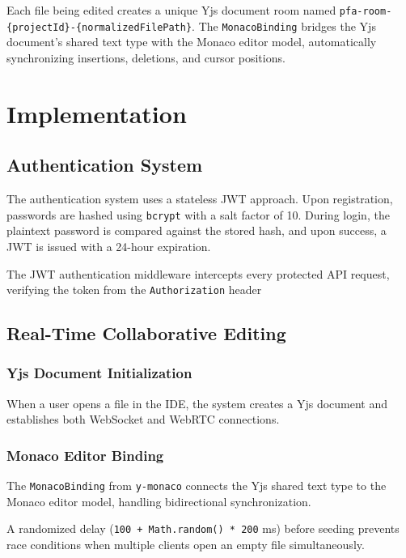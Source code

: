 \documentclass[12pt,a4paper,oneside]{report}
\begin{document}
Each file being edited creates a unique Yjs document room named \texttt{pfa-room-\{projectId\}-\{normalizedFilePath\}}. The \texttt{MonacoBinding} bridges the Yjs document's shared text type with the Monaco editor model, automatically synchronizing insertions, deletions, and cursor positions.


\chapter{Implementation}

\section{Authentication System}

The authentication system uses a stateless JWT approach. Upon registration, passwords are hashed using \texttt{bcrypt} with a salt factor of 10. During login, the plaintext password is compared against the stored hash, and upon success, a JWT is issued with a 24-hour expiration.

The JWT authentication middleware intercepts every protected API request, verifying the token from the \texttt{Authorization} header

\section{Real-Time Collaborative Editing}

\subsection{Yjs Document Initialization}

When a user opens a file in the IDE, the system creates a Yjs document and establishes both WebSocket and WebRTC connections.

\subsection{Monaco Editor Binding}

The \texttt{MonacoBinding} from \texttt{y-monaco} connects the Yjs shared text type to the Monaco editor model, handling bidirectional synchronization.

A randomized delay (\texttt{100 + Math.random() * 200} ms) before seeding prevents race conditions when multiple clients open an empty file simultaneously.
\end{document}

